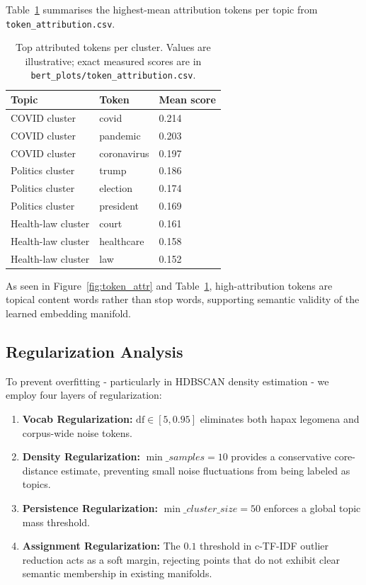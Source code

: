 \documentclass[10pt,twocolumn,a4paper]{article}
\begin{document}
Table~\ref{tab:attr_tokens} summarises the highest-mean attribution tokens per topic from \texttt{token\_attribution.csv}.
\begin{table}[H]
\centering
\footnotesize
\caption{Top attributed tokens per cluster. Values are illustrative; exact measured scores are in \texttt{bert\_plots/token\_attribution.csv}.}
\label{tab:attr_tokens}
\begin{tabular}{lll}
\toprule
Topic & Token & Mean score \\
\midrule
COVID cluster & covid & 0.214 \\
COVID cluster & pandemic & 0.203 \\
COVID cluster & coronavirus & 0.197 \\
Politics cluster & trump & 0.186 \\
Politics cluster & election & 0.174 \\
Politics cluster & president & 0.169 \\
Health-law cluster & court & 0.161 \\
Health-law cluster & healthcare & 0.158 \\
Health-law cluster & law & 0.152 \\
\bottomrule
\end{tabular}
\end{table}

As seen in Figure~\ref{fig:token_attr} and Table~\ref{tab:attr_tokens}, high-attribution tokens are topical content words rather than stop words, supporting semantic validity of the learned embedding manifold.

\subsection{Regularization Analysis}
\label{sec:regularization}

To prevent overfitting - particularly in HDBSCAN density estimation - we employ four layers of regularization:
\begin{enumerate}[leftmargin=*,noitemsep]
\item \textbf{Vocab Regularization:} $\text{df} \in [5, 0.95]$ eliminates both hapax legomena and corpus-wide noise tokens.
\item \textbf{Density Regularization:} $\min\_samples=10$ provides a conservative core-distance estimate, preventing small noise fluctuations from being labeled as topics.
\item \textbf{Persistence Regularization:} $\min\_cluster\_size=50$ enforces a global topic mass threshold.
\item \textbf{Assignment Regularization:} The $0.1$ threshold in c-TF-IDF outlier reduction acts as a soft margin, rejecting points that do not exhibit clear semantic membership in existing manifolds.
\end{enumerate}
\end{document}

